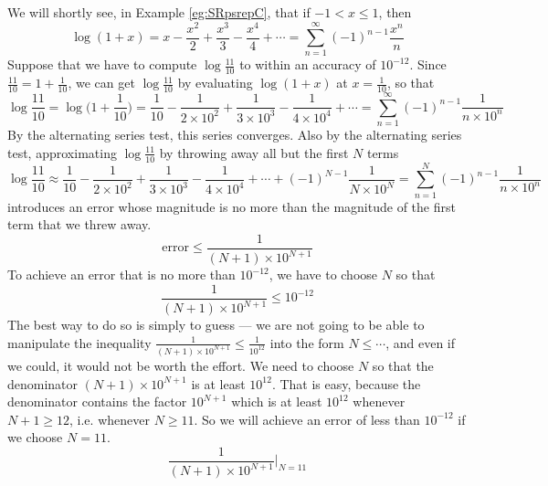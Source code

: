 \begin{eg}\label{eg:SRaltLog}
We will shortly see, in Example \ref{eg:SRpsrepC},
that if $-1<x\le 1$, then
\begin{equation*}
\log(1+x) = x-\frac{x^2}{2}+\frac{x^3}{3}-\frac{x^4}{4}+\cdots
= \sum_{n=1}^\infty (-1)^{n-1}\frac{x^n}{n}
\end{equation*}
Suppose that we have to compute $\log\frac{11}{10}$ to within an
accuracy of $10^{-12}$. Since $\frac{11}{10}=1+\frac{1}{10}$,
we can get $\log\frac{11}{10}$ by evaluating $\log(1+x)$
at $x=\frac{1}{10}$, so that
\begin{equation*}
\log\frac{11}{10} = \log\Big(1+\frac{1}{10}\Big)
          =\frac{1}{10}
           -\frac{1}{2\times 10^2}
           +\frac{1}{3\times 10^3}
           -\frac{1}{4\times 10^4}+\cdots
= \sum_{n=1}^\infty (-1)^{n-1}\frac{1}{n\times 10^n}
\end{equation*}
By the alternating series test, this series converges. Also by the
alternating series test, approximating $\log\frac{11}{10}$ by
throwing away all but the first $N$ terms
\begin{equation*}
\log\frac{11}{10} \approx
          \frac{1}{10}
           -\frac{1}{2\times 10^2}
           +\frac{1}{3\times 10^3}
           -\frac{1}{4\times 10^4}+\cdots
           +(-1)^{N-1}\frac{1}{N\times 10^N}
= \sum_{n=1}^{N} (-1)^{n-1}\frac{1}{n\times 10^n}
\end{equation*}
introduces an error whose magnitude is no more than the magnitude
of the first term that we threw away.
\begin{equation*}
\text{error} \le \frac{1}{(N+1)\times 10^{N+1}}
\end{equation*}
To achieve an error that is no more than $10^{-12}$, we have to choose $N$ so
that
\begin{equation*}
\frac{1}{(N+1)\times 10^{N+1}} \le 10^{-12}
\end{equation*}
The best way to do so is simply to guess --- we are not going to be able
to manipulate the inequality
   $\frac{1}{(N+1)\times 10^{N+1}} \le \frac{1}{10^{12}}$
into the form $N\le \cdots$, and even if we could, it would not
be worth the effort.
We need to choose $N$ so that the denominator $(N+1)\times 10^{N+1}$
is at least $10^{12}$. That is easy, because the denominator contains the factor $10^{N+1}$ which is at least $10^{12}$ whenever $N+1\ge 12$, i.e.
whenever $N\ge 11$. So we will achieve an error of less than $10^{-12}$
if we choose $N=11$.
\begin{equation*}
\frac{1}{(N+1)\times 10^{N+1}}\bigg|_{N=11}

\end{equation*}
\end{eg}
